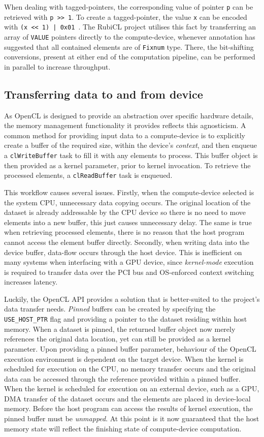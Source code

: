 When dealing with tagged-pointers, the corresponding value of pointer \verb|p| can be retrieved with \verb|p >> 1|. To create a tagged-pointer, the value \verb|x| can be encoded with \verb?(x << 1) | 0x01 ?. The RubiCL project utilises this fact by transferring an array of \verb|VALUE| pointers directly to the compute-device, whenever annotation has suggested that all contained elements are of \verb|Fixnum| type. There, the bit-shifting conversions, present at either end of the computation pipeline, can be performed in parallel to increase throughput.

\subsection{Transferring data to and from device}
As \ac{OpenCL} is designed to provide an abstraction over specific hardware details, the memory management functionality it provides reflects this agnosticism.
A common method for providing input data to a compute-device is to explicitly create a buffer of the required size, within the device's \emph{context}, and then enqueue a \verb|clWriteBuffer| task to fill it with any elements to process. This buffer object is then provided as a kernel parameter, prior to kernel invocation. To retrieve the processed elements, a \verb|clReadBuffer| task is enqueued.

This workflow causes several issues. Firstly, when the compute-device selected is the system \ac{CPU}, unnecessary data copying occurs. The original location of the dataset is already addressable by the \ac{CPU} device so there is no need to move elements into a new buffer, this just causes unnecessary delay. The same is true when retrieving processed elements, there is no reason that the host program cannot access the element buffer directly. Secondly, when writing data into the device buffer, data-flow occurs through the host device. This is inefficient on many systems when interfacing with a \ac{GPU} device, since \emph{kernel-mode} execution is required to transfer data over the \ac{PCI} bus and \ac{OS}-enforced context switching increases latency.

Luckily, the \ac{OpenCL} \ac{API} provides a solution that is better-suited to the project's data transfer needs.
\emph{Pinned} buffers can be created by specifying the \verb|USE_HOST_PTR| flag and providing a pointer to the dataset residing within host memory.
When a dataset is pinned, the returned buffer object now merely references the original data location, yet can still be provided as a kernel parameter.
Upon providing a pinned buffer parameter, behaviour of the \ac{OpenCL} execution environment is dependent on the target device.
When the kernel is scheduled for execution on the \ac{CPU}, no memory transfer occurs and the original data can be accessed through the reference provided within a pinned buffer.
When the kernel is scheduled for execution on an external device, such as a \ac{GPU}, \ac{DMA} transfer of the dataset occurs and the elements are placed in device-local memory.
Before the host program can access the results of kernel execution, the pinned buffer must be \emph{unmapped}. At this point is it now guaranteed that the host memory state will reflect the finishing state of compute-device computation.

